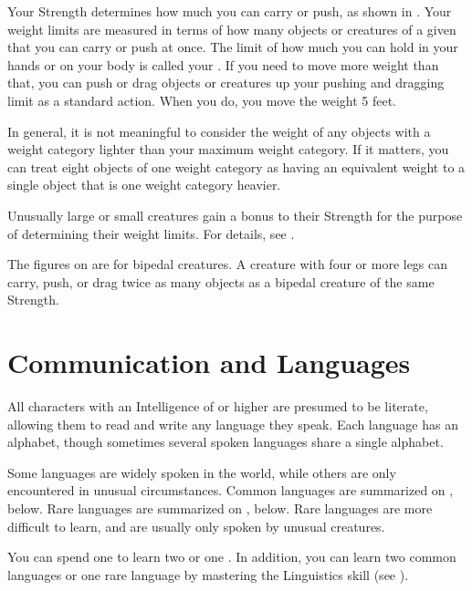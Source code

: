     Your Strength determines how much you can carry or push, as shown in .
    Your weight limits are measured in terms of how many objects or creatures of a given  that you can carry or push at once.
    The limit of how much you can hold in your hands or on your body is called your .
    If you need to move more weight than that, you can push or drag objects or creatures up your pushing and dragging limit as a standard action.
    When you do, you move the weight 5 feet.

    In general, it is not meaningful to consider the weight of any objects with a weight category lighter than your maximum weight category.
    If it matters, you can treat eight objects of one weight category as having an equivalent weight to a single object that is one weight category heavier.

     Unusually large or small creatures gain a bonus to their Strength for the purpose of determining their weight limits.
    For details, see .

     The figures on  are for bipedal creatures.
    A creature with four or more legs can carry, push, or drag twice as many objects as a bipedal creature of the same Strength.

\section{Communication and Languages}\label{Languages}\label{Communication and Languages}

    All characters with an Intelligence of  or higher are presumed to be literate, allowing them to read and write any language they speak. Each language has an alphabet, though sometimes several spoken languages share a single alphabet.

    \label{Language Rarity}
    Some languages are widely spoken in the world, while others are only encountered in unusual circumstances.
    Common languages are summarized on , below.
    Rare languages are summarized on , below.
    Rare languages are more difficult to learn, and are usually only spoken by unusual creatures.

    \label{Learning Languages}
    You can spend one  to learn two  or one .
    In addition, you can learn two common languages or one rare language by mastering the Linguistics skill (see ).

